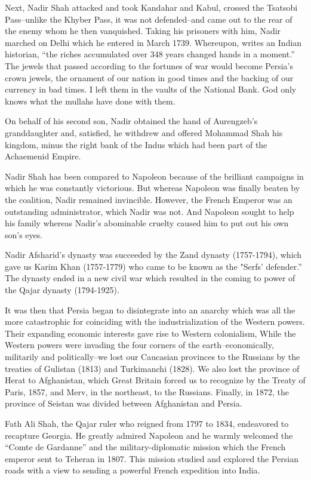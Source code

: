 Next, Nadir Shah attacked and took Kandahar and Kabul, crossed the Tsatsobi Pass--unlike the Khyber Pass, it was not defended--and came out to the rear of the enemy whom he then vanquished. Taking his prisoners with him, Nadir marched on Delhi which he entered in March 1739. Whereupon, writes an Indian historian, “the riches accumulated over 348 years changed hands in a moment.” The jewels that passed according to the fortunes of war would become Persia's crown jewels, the ornament of our nation in good times and the backing of our currency in bad times. I left them in the vaults of the National Bank. God only knows what the mullahs have done with them. 

On behalf of his second son, Nadir obtained the hand of Aurengzeb's granddaughter and, satisfied, he withdrew and offered Mohammad Shah his kingdom, minus the right bank of the Indus which had been part of the Achaemenid Empire. 

Nadir Shah has been compared to Napoleon because of the brilliant campaigns in which he was constantly victorious. But whereas Napoleon was finally beaten by the coalition, Nadir remained invincible. However, the French Emperor was an outstanding administrator, which Nadir was not. And Napoleon sought to help his family whereas Nadir's abominable cruelty caused him to put out his own son's eyes. 

Nadir Afsharid’s dynasty was succeeded by the Zand dynasty (1757-1794), which gave us Karim Khan (1757-1779) who came to be known as the "Serfs' defender.” The dynasty ended in a new civil war which resulted in the coming to power of the Qajar dynasty (1794-1925). 

It was then that Persia began to disintegrate into an anarchy which was all the more catastrophic for coinciding with the industrialization of the Western powers. Their expanding economic interests gave rise to Western colonialism, While the Western powers were invading the four corners of the earth--economically, militarily and politically--we lost our Caucasian provinces to the Russians by the treaties of Gulistan (1813) and Turkimanchi (1828). We also lost the province of Herat to Afghanistan, which Great Britain forced us to recognize by the Treaty of Paris, 1857, and Merv, in the northeast, to the Russians. Finally, in 1872, the province of Seistan was divided between Afghanistan and Persia. 

Fath Ali Shah, the Qajar ruler who reigned from 1797 to 1834, endeavored to recapture Georgia. He greatly admired Napoleon and he warmly welcomed the “Comte de Gardanne” and the military-diplomatic mission which the French emperor sent to Teheran in 1807. This mission studied and explored the Persian roads with a view to sending a powerful French expedition into India. 


